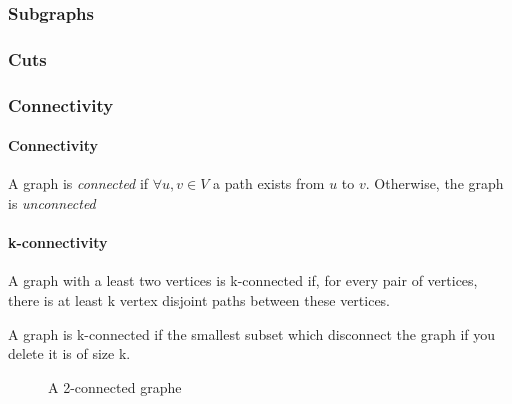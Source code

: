\subsubsection{Subgraphs}

\subsubsection{Cuts}



\subsubsection{Connectivity}
\paragraph{Connectivity}
A graph  is {\em connected} if $\forall u,v \in V$ a path exists from $u$
to $v$. Otherwise, the graph is {\em unconnected}

\paragraph{k-connectivity}
A graph with a least two vertices is k-connected if, for every pair of vertices, there is at least k vertex disjoint paths between these vertices.

A graph is k-connected if the smallest subset which disconnect the graph if you delete it is of size k.

\begin{figure}[!h]
  \begin{center}
    
  \end{center}
  \caption{A 2-connected graphe}
\end{figure}


